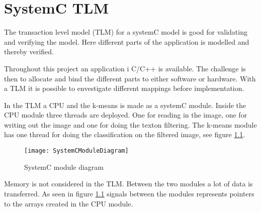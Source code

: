 \chapter{SystemC TLM}
The transaction level model (TLM) for a systemC model is good for validating and verifying the model. 
Here different parts of the application is modelled and thereby verified. 

Throughout this project an application i C/C++ is available. The challenge is then to allocate and bind the different parts to either software or hardware. 
With a TLM it is possible to envestigate different mappings before implementation. 

In the TLM a CPU and the k-means is made as a systemC module. Inside the CPU module three threads are deployed. One for reading in the image, one for writing out the image and one for doing the texton filtering. 
The k-means module has one thread for doing the classification on the filtered image, see figure \ref{fig:TLM}.

\begin{figure}[H]
\centering
\texttt{[image: SystemCModuleDiagram]}
\caption{SystemC module diagram}
\label{fig:TLM}
\end{figure}

Memory is not considered in the TLM. Between the two modules a lot of data is transferred. 
As seen in figure \ref{fig:TLM} signals between the modules represents pointers to the arrays created in the CPU module. 

